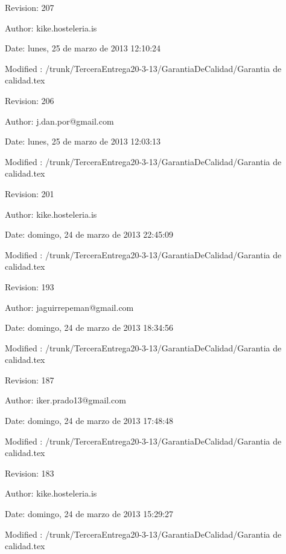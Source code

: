 \documentclass[spanish,a4paper,11pt, twoside]{report}	%
\begin{document}
	Revision: 207
	
	Author: kike.hosteleria.is
	
	Date: lunes, 25 de marzo de 2013 12:10:24
	
	Modified : /trunk/TerceraEntrega20-3-13/GarantiaDeCalidad/Garantia de calidad.tex

	\vspace{0.25cm}

	Revision: 206
	
	Author: j.dan.por@gmail.com
	
	Date: lunes, 25 de marzo de 2013 12:03:13
	
	Modified : /trunk/TerceraEntrega20-3-13/GarantiaDeCalidad/Garantia de calidad.tex

	\vspace{0.25cm}

	Revision: 201
	
	Author: kike.hosteleria.is
	
	Date: domingo, 24 de marzo de 2013 22:45:09
	
	Modified : /trunk/TerceraEntrega20-3-13/GarantiaDeCalidad/Garantia de calidad.tex

	\vspace{0.25cm}

	Revision: 193
	
	Author: jaguirrepeman@gmail.com
	
	Date: domingo, 24 de marzo de 2013 18:34:56
	
	Modified : /trunk/TerceraEntrega20-3-13/GarantiaDeCalidad/Garantia de calidad.tex

	\vspace{0.25cm}

	Revision: 187
	
	Author: iker.prado13@gmail.com
	
	Date: domingo, 24 de marzo de 2013 17:48:48
	
	Modified : /trunk/TerceraEntrega20-3-13/GarantiaDeCalidad/Garantia de calidad.tex

	\vspace{0.25cm}

	Revision: 183
	
	Author: kike.hosteleria.is
	
	Date: domingo, 24 de marzo de 2013 15:29:27
	
	Modified : /trunk/TerceraEntrega20-3-13/GarantiaDeCalidad/Garantia de calidad.tex

	\vspace{0.25cm}
\end{document}
